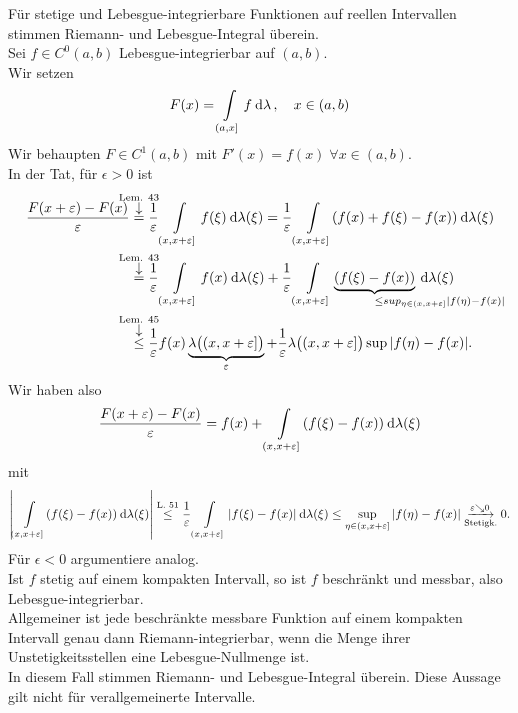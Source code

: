 \documentclass[skript.tex]{subfiles}
\begin{document}
	\begin{bem}
		Für stetige und Lebesgue-integrierbare Funktionen auf reellen Intervallen stimmen
		Riemann- und Lebesgue-Integral überein. \\
		Sei $f \in C^0 (a,b)$ Lebesgue-integrierbar auf $(a,b)$. \\
		Wir setzen
		\[
			F(x) = \int\limits_{(a,x]} f \: \mathrm{d}\lambda\,, \quad x \in (a,b)
		\]
		Wir behaupten $F \in C^1(a,b)$ mit $F'(x) = f(x) \; \forall x \in (a,b)$. \\ 
		In der Tat, für $\epsilon > 0$ ist
		\begin{align*}
			\frac{F(x+\epsilon)-F(x)}{\epsilon} &\darrow{\text{Lem. 43}}{=}
			\frac{1}{\epsilon} \lint_{(x,x+\epsilon]} f(\xi) \md \lambda(\xi)
			= \frac{1}{\epsilon} \lint_{(x,x+\epsilon]} (f(x)+f(\xi)-f(x)) \md \lambda(\xi)
			\\ &\darrow{\text{Lem. 43}}{=}
			\frac{1}{\epsilon}\lint_{(x,x+\epsilon]} f(x) \md \lambda(\xi)
			+ \frac{1}{\epsilon}\lint_{(x,x+\epsilon]} 
			\underbrace{(f(\xi)-f(x))}_{
				\mathrlap{
					\leq sup_{\eta\in(x,x+\epsilon]} |f(\eta)-f(x)|
				}
			}
			\md \lambda(\xi) \\
			&\darrow{\text{Lem. 45}}{\leq}
			\frac{1}{\epsilon} f(x)
			\underbrace{\lambda\big((x,x+\epsilon]\big)}_\epsilon
			+ \frac{1}{\epsilon} \lambda\big((x,x+\epsilon]\big) \sup | f(\eta)-f(x)|.
		\end{align*}
		Wir haben also
		\[
			\frac{F(x+\varepsilon)-F(x)}{\varepsilon}
			= f(x) + \int\limits_{(x,x+\varepsilon]}(f(\xi)-f(x)) \: \mathrm{d} \lambda(\xi)
		\]
		mit
		\[
			\left|\int\limits_{(x,x+\varepsilon]}(f(\xi)-f(x)) \: \mathrm{d} \lambda(\xi)\right|
			\overset{\text{L. 51}}{\leq}
			\frac{1}{\varepsilon} \int\limits_{(x,x+\varepsilon]}|f(\xi)-f(x)| \: \mathrm{d} \lambda(\xi)
			\leq \sup_{\eta\in(x,x+\varepsilon]} |f(\eta)-f(x)|
			\underset{\text{Stetigk.}}{\xrightarrow{\varepsilon\searrow 0}} 0.
		\]
		Für $\epsilon < 0$ argumentiere analog. \\
		Ist $f$ stetig auf einem kompakten Intervall, so ist $f$ beschränkt und messbar,
		also Lebesgue-integrierbar.\\
		
		Allgemeiner ist jede beschränkte messbare Funktion auf einem kompakten
		Intervall genau dann Riemann-integrierbar, wenn die Menge ihrer Unstetigkeitsstellen eine Lebesgue-Nullmenge ist. \\
		In diesem Fall stimmen Riemann- und Lebesgue-Integral überein. Diese Aussage gilt nicht für verallgemeinerte Intervalle.
	\end{bem}
\end{document}
